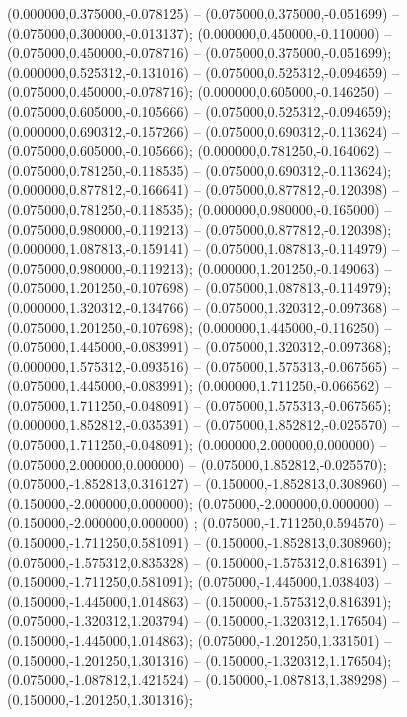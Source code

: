  (0.000000,0.375000,-0.078125) -- (0.075000,0.375000,-0.051699) -- (0.075000,0.300000,-0.013137);
 (0.000000,0.450000,-0.110000) -- (0.075000,0.450000,-0.078716) -- (0.075000,0.375000,-0.051699);
 (0.000000,0.525312,-0.131016) -- (0.075000,0.525312,-0.094659) -- (0.075000,0.450000,-0.078716);
 (0.000000,0.605000,-0.146250) -- (0.075000,0.605000,-0.105666) -- (0.075000,0.525312,-0.094659);
 (0.000000,0.690312,-0.157266) -- (0.075000,0.690312,-0.113624) -- (0.075000,0.605000,-0.105666);
 (0.000000,0.781250,-0.164062) -- (0.075000,0.781250,-0.118535) -- (0.075000,0.690312,-0.113624);
 (0.000000,0.877812,-0.166641) -- (0.075000,0.877812,-0.120398) -- (0.075000,0.781250,-0.118535);
 (0.000000,0.980000,-0.165000) -- (0.075000,0.980000,-0.119213) -- (0.075000,0.877812,-0.120398);
 (0.000000,1.087813,-0.159141) -- (0.075000,1.087813,-0.114979) -- (0.075000,0.980000,-0.119213);
 (0.000000,1.201250,-0.149063) -- (0.075000,1.201250,-0.107698) -- (0.075000,1.087813,-0.114979);
 (0.000000,1.320312,-0.134766) -- (0.075000,1.320312,-0.097368) -- (0.075000,1.201250,-0.107698);
 (0.000000,1.445000,-0.116250) -- (0.075000,1.445000,-0.083991) -- (0.075000,1.320312,-0.097368);
 (0.000000,1.575312,-0.093516) -- (0.075000,1.575313,-0.067565) -- (0.075000,1.445000,-0.083991);
 (0.000000,1.711250,-0.066562) -- (0.075000,1.711250,-0.048091) -- (0.075000,1.575313,-0.067565);
 (0.000000,1.852812,-0.035391) -- (0.075000,1.852812,-0.025570) -- (0.075000,1.711250,-0.048091);
 (0.000000,2.000000,0.000000) -- (0.075000,2.000000,0.000000) -- (0.075000,1.852812,-0.025570);
 (0.075000,-1.852813,0.316127) -- (0.150000,-1.852813,0.308960) -- (0.150000,-2.000000,0.000000);
 (0.075000,-2.000000,0.000000) -- (0.150000,-2.000000,0.000000) ;
 (0.075000,-1.711250,0.594570) -- (0.150000,-1.711250,0.581091) -- (0.150000,-1.852813,0.308960);
 (0.075000,-1.575312,0.835328) -- (0.150000,-1.575312,0.816391) -- (0.150000,-1.711250,0.581091);
 (0.075000,-1.445000,1.038403) -- (0.150000,-1.445000,1.014863) -- (0.150000,-1.575312,0.816391);
 (0.075000,-1.320312,1.203794) -- (0.150000,-1.320312,1.176504) -- (0.150000,-1.445000,1.014863);
 (0.075000,-1.201250,1.331501) -- (0.150000,-1.201250,1.301316) -- (0.150000,-1.320312,1.176504);
 (0.075000,-1.087812,1.421524) -- (0.150000,-1.087813,1.389298) -- (0.150000,-1.201250,1.301316);
